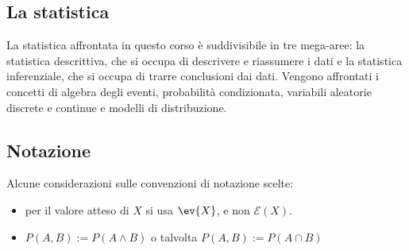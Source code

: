 %
%
%
%

\subsection*{La statistica}
La statistica affrontata in questo corso è suddivisibile in tre mega-aree: la statistica descrittiva, che si occupa di descrivere e riassumere i dati e la statistica inferenziale, che si occupa di trarre conclusioni dai dati. Vengono affrontati i concetti di algebra degli eventi, probabilità condizionata, variabili aleatorie discrete e continue e modelli di distribuzione.

\subsection*{Notazione}
Alcune considerazioni sulle convenzioni di notazione scelte:
\begin{itemize}
	\item per il valore atteso di $X$ si usa $\ev{X}$, e non $\mathcal{E}(X)$.
	\item $P(A,B):=P(A\land B)$ o talvolta $P(A,B):=P(A\cap B)$
\end{itemize}

